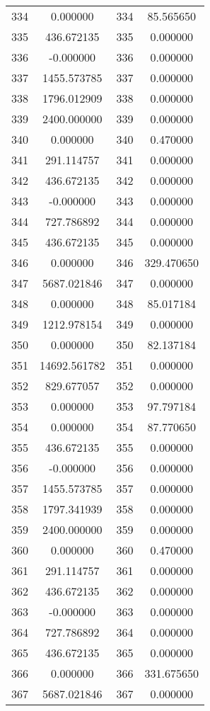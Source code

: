 \documentclass[12pt]{article}
\begin{document}
\begin{longtable}{@{}cccc@{}}
334 & 0.000000 & 334 & 85.565650 \\
335 & 436.672135 & 335 & 0.000000 \\
336 & -0.000000 & 336 & 0.000000 \\
337 & 1455.573785 & 337 & 0.000000 \\
338 & 1796.012909 & 338 & 0.000000 \\
339 & 2400.000000 & 339 & 0.000000 \\
340 & 0.000000 & 340 & 0.470000 \\
341 & 291.114757 & 341 & 0.000000 \\
342 & 436.672135 & 342 & 0.000000 \\
343 & -0.000000 & 343 & 0.000000 \\
344 & 727.786892 & 344 & 0.000000 \\
345 & 436.672135 & 345 & 0.000000 \\
346 & 0.000000 & 346 & 329.470650 \\
347 & 5687.021846 & 347 & 0.000000 \\
348 & 0.000000 & 348 & 85.017184 \\
349 & 1212.978154 & 349 & 0.000000 \\
350 & 0.000000 & 350 & 82.137184 \\
351 & 14692.561782 & 351 & 0.000000 \\
352 & 829.677057 & 352 & 0.000000 \\
353 & 0.000000 & 353 & 97.797184 \\
354 & 0.000000 & 354 & 87.770650 \\
355 & 436.672135 & 355 & 0.000000 \\
356 & -0.000000 & 356 & 0.000000 \\
357 & 1455.573785 & 357 & 0.000000 \\
358 & 1797.341939 & 358 & 0.000000 \\
359 & 2400.000000 & 359 & 0.000000 \\
360 & 0.000000 & 360 & 0.470000 \\
361 & 291.114757 & 361 & 0.000000 \\
362 & 436.672135 & 362 & 0.000000 \\
363 & -0.000000 & 363 & 0.000000 \\
364 & 727.786892 & 364 & 0.000000 \\
365 & 436.672135 & 365 & 0.000000 \\
366 & 0.000000 & 366 & 331.675650 \\
367 & 5687.021846 & 367 & 0.000000 \\

\end{longtable}
\end{document}
